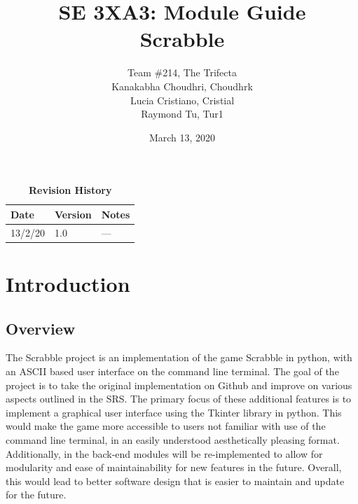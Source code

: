 \documentclass[12pt, titlepage]{article}
\title{SE 3XA3: Module Guide \\ Scrabble}
\author{Team \#214, The Trifecta
		\\ Kanakabha Choudhri, Choudhrk
		\\ Lucia Cristiano, Cristial
		\\ Raymond Tu, Tur1
}
\date{March 13, 2020}
\begin{document}
\maketitle

\tableofcontents
\listoftables
\listoffigures

\begin{table}[bp]
\caption{\bf Revision History}
\begin{tabularx}{\textwidth}{p{3cm}p{2cm}X}
\toprule {\bf Date} & {\bf Version} & {\bf Notes}\\
\midrule
13/2/20 & 1.0 & ---\\
\bottomrule
\end{tabularx}
\end{table}

\newpage


\section{Introduction} %

\subsection{Overview}

The Scrabble project is an implementation of the game Scrabble in python, with an ASCII based user interface on the command line terminal. The goal of the project is to take the original implementation on Github and improve on various aspects outlined in the SRS. The primary focus of these additional features is to implement a graphical user interface using the Tkinter library in python. This would make the game more accessible to users not familiar with use of the command line terminal, in an easily understood aesthetically pleasing format. Additionally, in the back-end modules will be re-implemented to allow for modularity and ease of maintainability for new features in the future. Overall, this would lead to better software design that is easier to maintain and update for the future. 
\end{document}
